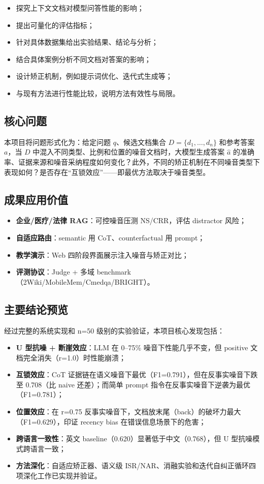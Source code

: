 \documentclass[UTF8,zihao=-4]{ctexart}
\begin{document}
\begin{itemize}
  \item 探究上下文文档对模型问答性能的影响；
  \item 提出可量化的评估指标；
  \item 针对具体数据集给出实验结果、结论与分析；
  \item 结合具体案例分析不同文档对答案的影响；
  \item 设计矫正机制，例如提示词优化、迭代式生成等；
  \item 与现有方法进行性能比较，说明方法有效性与局限。
\end{itemize}

\subsection{核心问题}
本项目将问题形式化为：给定问题 $q$、候选文档集合 $D=\{d_1,\dots,d_n\}$ 和参考答案 $a$，当 $D$ 中混入不同类型、比例和位置的噪音文档时，大模型生成答案 $\hat{a}$ 的准确率、证据来源和噪音采纳程度如何变化？此外，不同的矫正机制在不同噪音类型下表现如何？是否存在“互锁效应”——即最优方法取决于噪音类型。


\subsection{成果应用价值}
\begin{itemize}
  \item \textbf{企业/医疗/法律 RAG}：可控噪音压测 NS/CRR，评估 distractor 风险；
  \item \textbf{自适应路由}：semantic 用 CoT、counterfactual 用 prompt；
  \item \textbf{教学演示}：Web 四阶段界面展示注入噪音与矫正对比；
  \item \textbf{评测协议}：Judge + 多域 benchmark（2Wiki/MobileMem/Cmedqa/BRIGHT）。
\end{itemize}

\subsection{主要结论预览}
经过完整的系统实现和 n=50 级别的实验验证，本项目核心发现包括：

\begin{itemize}
  \item \textbf{U 型抗噪 + 断崖效应}：LLM 在 0--75\% 噪音下性能几乎不变，但 positive 文档完全消失（r=1.0）时性能崩溃；
  \item \textbf{互锁效应}：CoT 证据链在语义噪音下最优（F1=0.791），但在反事实噪音下跌至 0.708（比 naive 还差）；而简单 prompt 指令在反事实噪音下逆袭为最优（F1=0.781）；
  \item \textbf{位置效应}：在 r=0.75 反事实噪音下，文档放末尾（back）的破坏力最大（F1=0.629），印证 recency bias 在错误信息场景下的危害；
  \item \textbf{跨语言一致性}：英文 baseline（0.620）显著低于中文（0.768），但 U 型抗噪模式跨语言一致；
  \item \textbf{方法深化}：自适应矫正器、语义级 ISR/NAR、消融实验和迭代自纠正循环四项深化工作已实现并验证。
\end{itemize}
\end{document}

